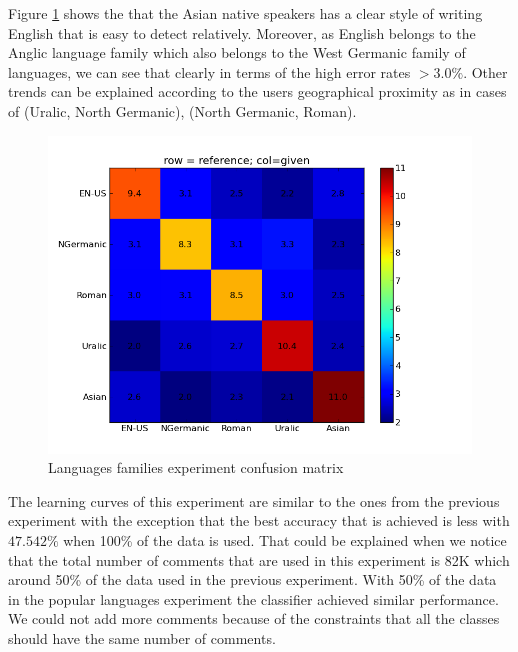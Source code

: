 \documentclass[11pt]{article}
\begin{document}
Figure \ref{fam_cfm} shows the that the Asian native speakers has a clear style of writing English that is easy to detect relatively. Moreover, as English belongs to the Anglic language family which also belongs to the West Germanic family of languages, we can see that clearly in terms of the high error rates $>3.0\%$. Other trends can be explained according to the users geographical proximity as in cases of (Uralic, North Germanic), (North Germanic, Roman).

\begin{figure}[htp]
\centering
\includegraphics[scale=0.45]{family_cfm.png}
\caption{Languages families experiment confusion matrix}
\label{fam_cfm}
\end{figure}

The learning curves of this experiment are similar to the ones from the previous experiment with the exception that the best accuracy that is achieved is less with $47.542\%$ when 100\% of the data is used. That could be explained when we notice that the total number of comments that are used in this experiment is 82K which around 50\% of the data used in the previous experiment. With 50\% of the data in the popular languages experiment the classifier achieved similar performance. We could not add more comments because of the constraints that all the classes should have the same number of comments.
\end{document}
